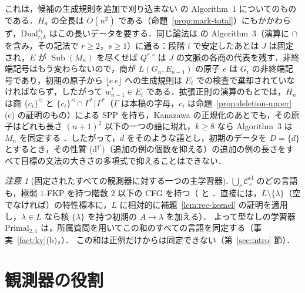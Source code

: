\documentclass[11pt,a4paper]{ltjsarticle}
\numberwithin{equation}{section}
\theoremstyle{plain}
\theoremstyle{definition}
\theoremstyle{remark}
\newtheorem{remark}[theorem]{注意}
\theoremstyle{plain}
\newcommand{\eps}{\lambda}
\newcommand{\Lc}{^{\lhd}}
\newcommand{\Sub}{\operatorname{Sub}}
\newcommand{\Ccf}[1]{\mathcal C^{\mathrm{cf}}_{#1}}
\newcommand{\Lfl}{\lfloor}
\newcommand{\Rfl}{\rfloor}
\newcommand{\Lce}{\lceil}
\begin{document}
これは，候補の生成規則を追加で刈り込まない \citet{ky2017} の Algorithm~1 についてのものである．$H_n$ の全長は $O(n^2)$ である（命題~\ref{prop:mark-total}）にもかかわらず，$\mathrm{Dual}^{s_U}_{r,k}$ はこの長いデータを要する．同じ論法は \citet{kanazawa2023wollic} の Algorithm~3（演算に $\cap$ を含み，その記法で $r\ge2$，$s\ge1$）に通る：段階 $i$ で安定したあとは $J$ は固定され，$E$ が $\Sub(M_n)$ を尽くせば $Q^{r,s}$ は $J$ の文脈の各商の代表を残す．非終端記号はもう変わらないので，商が $L(G_n,E_{n-1})$ の原子 $e$ は $G_i$ の非終端記号であり，初期の原子から $\Lfl e\,e\Rfl$ への生成規則は $E_i$ での検査で棄却されていなければならず，したがって $w^*_{n-1}\in E_i$ である．拡張正則の演算のもとでは，$H_n$ は商 $\{c_i\}\Lc$ と $\{c_i\}\Lc\cap\Gamma^*\Lce\Gamma^*$（$\Gamma$ は本稿の字母，$c_i$ は命題~\ref{prop:deletion-upper}(c) の証明のもの）による SPP を持ち，Kanazawa の正規化のあとでも，その原子はどれも長さ $(n+1)^2$ 以下の一つの語に現れ，$k\ge8$ なら Algorithm~3 は $M_n$ を同定する \citep[Thm.~8]{kanazawa2023wollic}．したがって，$d$ をそのような語とし，初期のデータを $D=\{d\}$ とするとき，その性質 (d$^{\dagger\prime}$)（追加の例の個数を抑える）の追加の例の長さをすべて目標の文法の大きさの多項式で抑えることはできない．

\begin{remark}[固定されたすべての観測器に対する一つの主学習器]\label{rem:uniform-known}
$\bigcup_s\Ccf s$ のどの言語も，極弱 $1$-FKP を持つ階数 $2$ 以下の CFG を持つ（\citealp[Prop.~9.7]{kuriyama-tcs1} と \citealp[Sec.~6.3]{yoshinaka2015}．直接には，$L\setminus\{\eps\}$（空でなければ）の特性標本に，$L$ に相対的に補題~\ref{lem:rec-kernel} の証明を適用し，$\eps\in L$ なら核 $\{\eps\}$ を持つ初期の $A\to\eps$ を加える）．
よって型なしの学習器 $\mathrm{Primal}_{2,1}$ は，所属質問を用いてこの和のすべての言語を同定する（事実~\ref{fact:ky}(b)，\citealp[Thm.~6]{ky2017}）．
この和は正例だけからは同定できない（第~\ref{sec:intro} 節）．
\end{remark}


\section{観測器の役割}
\label{sec:duality}
\end{document}
